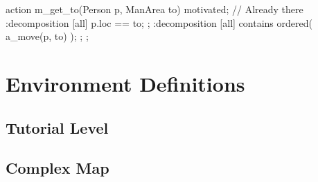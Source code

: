 \begin{anmlcode}
action m_get_to(Person p, ManArea to) {
  motivated;
  // Already there
  :decomposition {
    [all] p.loc == to;
  };
  :decomposition {
    [all] contains ordered(
      a_move(p, to)
    );
  };
};
\end{anmlcode}

\section{Environment Definitions}
\label{app:environments}

\subsection{Tutorial Level}

\subsection{Complex Map}
